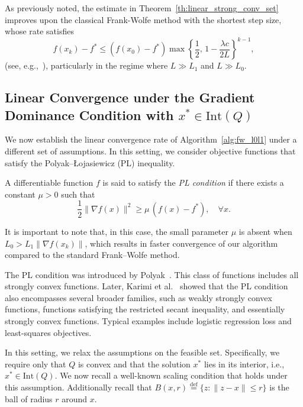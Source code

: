 \documentclass[runningheads]{llncs}
\begin{document}
	As previously noted, the estimate in Theorem~\ref{th:linear_strong_conv_set} improves upon the classical Frank-Wolfe method with the shortest step size, whose rate satisfies
	\[
	f(x_k) - f^\ast \le (f(x_0) - f^\ast)
	\max\!\left\{\frac{1}{2},\, 1 - \frac{\lambda c}{2L}\right\}^{k-1},
	\]
	(see, e.g.,~\cite{braun2022conditional}), particularly in the regime where $L \gg L_1$ and $L \gg L_0$.
	
	\subsection{Linear Convergence under the Gradient Dominance Condition with $x^* \in \mathrm{Int}(Q)$}
	
	We now establish the linear convergence rate of Algorithm~\ref{alg:fw_l0l1} under a different set of assumptions.  
	In this setting, we consider objective functions that satisfy the Polyak--Łojasiewicz (PL) inequality.
	
	\begin{definition}\label{def:pl_cond}
		A differentiable function $f$ is said to satisfy the \emph{PL condition} if there exists a constant $\mu > 0$ such that
		\[
		\frac{1}{2}\|\nabla f(x)\|^2 \geq \mu\,(f(x) - f^*), \quad \forall x.
		\]
	\end{definition}
	
	It is important to note that, in this case, the small parameter $\mu$ is absent when $L_0 > L_1 \|\nabla f(x_k)\|$, which results in faster convergence of our algorithm compared to the standard Frank--Wolfe method.
	
	The PL condition was introduced by Polyak~\cite{polyak1963gradient}.  
	This class of functions includes all strongly convex functions.  
	Later, Karimi et al.~\cite{karimi2016linear} showed that the PL condition also encompasses several broader families, such as weakly strongly convex functions, functions satisfying the restricted secant inequality, and essentially strongly convex functions.  
	Typical examples include logistic regression loss and least-squares objectives.
	
	In this setting, we relax the assumptions on the feasible set.  
	Specifically, we require only that $Q$ is convex and that the solution $x^*$ lies in its interior, i.e., $x^* \in \mathrm{Int}(Q)$.  
	We now recall a well-known scaling condition that holds under this assumption. Additionally recall that $B(x,r) \overset{\text{def}}{=} \{ z: \| z - x \| \leq r \}$ is the ball of radius $r$ around $x$.
	
\end{document}
